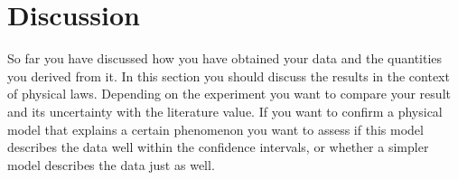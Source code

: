 \section{Discussion}

So far you have discussed how you have obtained your data and the
quantities you derived from it. In this section you should discuss
the results in the context of physical laws. Depending on the
experiment you want to compare your result and its uncertainty with
the literature value. If you want to confirm a physical model that
explains a certain phenomenon you want to assess if this model
describes the data well within the confidence intervals, or whether
a simpler model describes the data just as well.